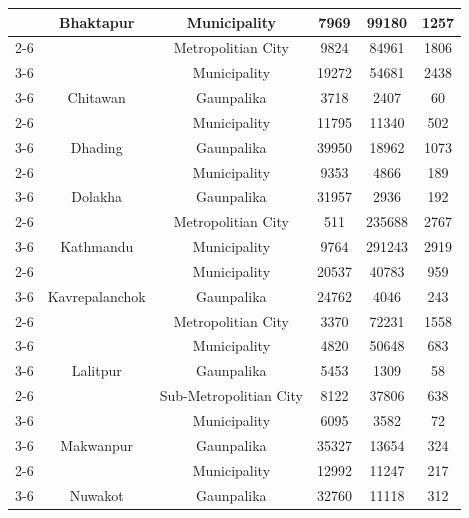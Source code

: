 \documentclass[
  letterpaper,
  DIV=11,
  numbers=noendperiod]{scrartcl}
\begin{document}
\begin{longtable}[t]{>{}lccccc}
\endfoot
\bottomrule
\endlastfoot
 & Bhaktapur & Municipality & 7969 & 99180 & 1257\\
\cmidrule{2-6}\nopagebreak
 &  & Metropolitian City & 9824 & 84961 & 1806\\
\cmidrule{3-6}\nopagebreak
 &  & Municipality & 19272 & 54681 & 2438\\
\cmidrule{3-6}\nopagebreak
 & \multirow[t]{-3}{*}{\centering\arraybackslash Chitawan} & Gaunpalika & 3718 & 2407 & 60\\
\cmidrule{2-6}\nopagebreak
 &  & Municipality & 11795 & 11340 & 502\\
\cmidrule{3-6}\nopagebreak
 & \multirow[t]{-2}{*}{\centering\arraybackslash Dhading} & Gaunpalika & 39950 & 18962 & 1073\\
\cmidrule{2-6}\nopagebreak
 &  & Municipality & 9353 & 4866 & 189\\
\cmidrule{3-6}\nopagebreak
 & \multirow[t]{-2}{*}{\centering\arraybackslash Dolakha} & Gaunpalika & 31957 & 2936 & 192\\
\cmidrule{2-6}\nopagebreak
 &  & Metropolitian City & 511 & 235688 & 2767\\
\cmidrule{3-6}\nopagebreak
 & \multirow[t]{-2}{*}{\centering\arraybackslash Kathmandu} & Municipality & 9764 & 291243 & 2919\\
\cmidrule{2-6}\nopagebreak
 &  & Municipality & 20537 & 40783 & 959\\
\cmidrule{3-6}\nopagebreak
 & \multirow[t]{-2}{*}{\centering\arraybackslash Kavrepalanchok} & Gaunpalika & 24762 & 4046 & 243\\
\cmidrule{2-6}\nopagebreak
 &  & Metropolitian City & 3370 & 72231 & 1558\\
\cmidrule{3-6}\nopagebreak
 &  & Municipality & 4820 & 50648 & 683\\
\cmidrule{3-6}\nopagebreak
 & \multirow[t]{-3}{*}{\centering\arraybackslash Lalitpur} & Gaunpalika & 5453 & 1309 & 58\\
\cmidrule{2-6}\nopagebreak
 &  & Sub-Metropolitian City & 8122 & 37806 & 638\\
\cmidrule{3-6}\nopagebreak
 &  & Municipality & 6095 & 3582 & 72\\
\cmidrule{3-6}\nopagebreak
 & \multirow[t]{-3}{*}{\centering\arraybackslash Makwanpur} & Gaunpalika & 35327 & 13654 & 324\\
\cmidrule{2-6}\nopagebreak
 &  & Municipality & 12992 & 11247 & 217\\
\cmidrule{3-6}\nopagebreak
 & \multirow[t]{-2}{*}{\centering\arraybackslash Nuwakot} & Gaunpalika & 32760 & 11118 & 312\\

\end{longtable}
\end{document}
